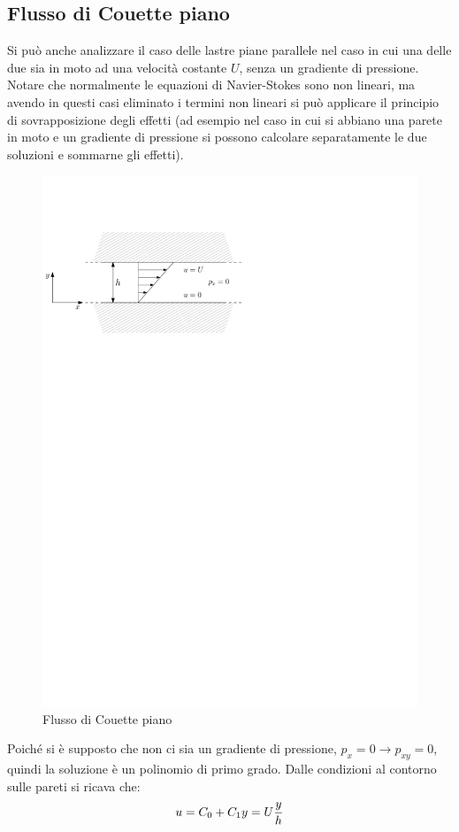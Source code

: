 \subsection{Flusso di Couette piano}
Si può anche analizzare il caso delle lastre piane parallele nel caso in cui una delle due sia in moto ad una velocità costante $U$, senza un gradiente di pressione.
Notare che normalmente le equazioni di Navier-Stokes sono non lineari, ma avendo in questi casi eliminato i termini non lineari si può applicare il principio di sovrapposizione degli effetti (ad esempio nel caso in cui si abbiano una parete in moto e un gradiente di pressione si possono calcolare separatamente le due soluzioni e sommarne gli effetti).
%
	\begin{figure}[ht]
		\includegraphics[scale=1.0]{./3.6 Soluzioni esatte equazioni di Navier-Stokes/3.6-2}
		\centering
		\caption{Flusso di Couette piano}
	\end{figure}
%
Poiché si è supposto che non ci sia un gradiente di pressione, $p_x = 0 \rightarrow p_{xy} = 0$, quindi la soluzione è un polinomio di primo grado.
Dalle condizioni al contorno sulle pareti si ricava che:
%
	\begin{equation*}
		u = C_0 + C_1 y = U \frac{y}{h}\\
	\end{equation*}
%

